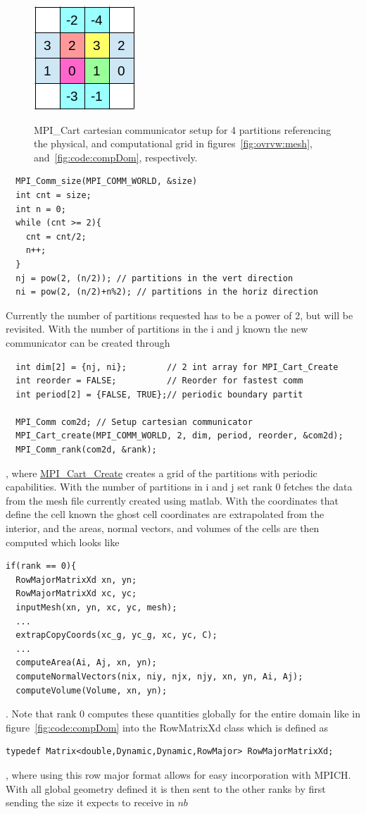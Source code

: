 \documentclass[paper=a4, fontsize=11pt]{scrartcl}
\numberwithin{equation}{section}                %
\numberwithin{figure}{section}                  %
\numberwithin{table}{section}                           %
\begin{document}
\begin{figure}[!htb]
  \centering
  \includegraphics[width=0.175\linewidth]{fig/partition}\label{fig:code:part}
  \caption{MPI\_Cart cartesian communicator setup for 4 partitions referencing the physical, and computational grid in figures~\ref{fig:ovrvw:mesh}, and~\ref{fig:code:compDom}, respectively.}
\end{figure}



\begin{verbatim}
  MPI_Comm_size(MPI_COMM_WORLD, &size)
  int cnt = size;
  int n = 0;
  while (cnt >= 2){
    cnt = cnt/2;
    n++;
  }
  nj = pow(2, (n/2)); // partitions in the vert direction
  ni = pow(2, (n/2)+n%2); // partitions in the horiz direction
\end{verbatim}

Currently the number of partitions requested has to be a power of 2, but will be revisited. With the number of partitions in the i and j known the new communicator can be created through

\begin{verbatim}
  int dim[2] = {nj, ni};        // 2 int array for MPI_Cart_Create
  int reorder = FALSE;          // Reorder for fastest comm
  int period[2] = {FALSE, TRUE};// periodic boundary partit

  MPI_Comm com2d; // Setup cartesian communicator
  MPI_Cart_create(MPI_COMM_WORLD, 2, dim, period, reorder, &com2d);
  MPI_Comm_rank(com2d, &rank);
\end{verbatim}
, where \href{https://www.mpich.org/static/docs/v3.2/www3/MPI\_Cart\_create.html}{MPI\_Cart\_Create} creates a grid of the partitions with periodic capabilities. With the number of partitions in i and j set rank 0 fetches the data from the mesh file currently created using matlab. With the coordinates that define the cell known the ghost cell coordinates are extrapolated from the interior, and the areas, normal vectors, and volumes of the cells are then computed which looks like
\begin{verbatim}
if(rank == 0){
  RowMajorMatrixXd xn, yn;
  RowMajorMatrixXd xc, yc;
  inputMesh(xn, yn, xc, yc, mesh);
  ...
  extrapCopyCoords(xc_g, yc_g, xc, yc, C);
  ...
  computeArea(Ai, Aj, xn, yn);
  computeNormalVectors(nix, niy, njx, njy, xn, yn, Ai, Aj);
  computeVolume(Volume, xn, yn);
\end{verbatim}
. Note that rank 0 computes these quantities globally for the entire domain like in figure~\ref{fig:code:compDom} into the RowMatrixXd class which is defined as
\begin{verbatim}
typedef Matrix<double,Dynamic,Dynamic,RowMajor> RowMajorMatrixXd;
\end{verbatim}
, where using this row major format allows for easy incorporation with MPICH. With all global geometry defined it is then sent to the other ranks by first sending the size it expects to receive in $nb$
\end{document}

